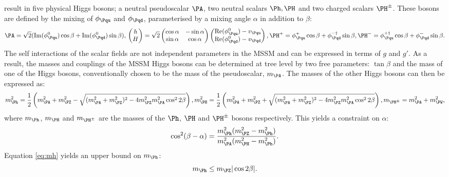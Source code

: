 result in five physical Higgs bosons; a neutral pseudoscalar $\PA$, two neutral
scalars $\Ph,\PH$ and two charged scalars $\PH^{\pm}$. These bosons are defined
by the mixing of $\phi_{\Pqu}$ and $\phi_{\Pqd}$, parameterised by a mixing
angle $\alpha$ in addition to $\beta$:
\begin{equation}
\PA = \sqrt{2}(\text{Im}(\phi_{\Pqu}^{0})\cos\beta +
\text{Im}(\phi_{\Pqd}^{0})\sin\beta), \\ 
\begin{pmatrix} h \\ H \end{pmatrix} = \sqrt{2} 
\begin{pmatrix} \cos\alpha & -\sin\alpha \\ \sin\alpha & \cos\alpha \end{pmatrix}
\begin{pmatrix} \text{Re}(\phi_{\Pqu}^{0}) - v_{\Pqu} \\ \text{Re}(\phi_{\Pqd}^{0}) -
v_{\Pqd}\end{pmatrix}, \\
\PH^{+} = \phi_{\Pqu}^{+} \cos \beta + \phi_{\Pqd}^{-\dagger} \sin \beta,\\
\PH^{-} = \phi_{\Pqu}^{+\dagger} \cos \beta + \phi_{\Pqd}^{-} \sin \beta.
\end{equation}
The self interactions of the scalar fields are not independent parameters in the
\ac{MSSM} and can be expressed in terms of $g$ and $g'$. As a result, the masses
and couplings of the \ac{MSSM} Higgs bosons can be determined at tree level by
two free parameters: $\tan\beta$ and the mass of one of the Higgs bosons,
conventionally chosen to be the mass of the pseudoscalar, $m_{\PA}$. The masses
of the other Higgs bosons can then be expressed as:
\begin{equation}
m_{\Ph}^{2} = \frac{1}{2} \left( m_{\PA}^{2} + m_{\PZ}^{2} - \sqrt{(m_{\PA}^{2} +
m_{\PZ}^{2})^{2} - 4m_{\PZ}^{2}m_{\PA}^{2}\cos^{2}{2\beta} }\right) ,
\label{eq:mh}\\
m_{\PH}^{2} = \frac{1}{2} \left( m_{\PA}^{2} + m_{\PZ}^{2} + \sqrt{(m_{\PA}^{2} +
m_{\PZ}^{2})^{2} - 4m_{\PZ}^{2}m_{\PA}^{2}\cos^{2}{2\beta} }\right) , \\
m_{\PH^{\pm}} = m_{\PA}^{2} + m_{\PW}^{2},
\end{equation}
where $m_{\Ph}$, $m_{\PH}$ and $m_{\PH^{\pm}}$ are the masses of the $\Ph$,
$\PH$ and $\PH^{\pm}$ bosons respectively. This yields a constraint on $\alpha$:
\begin{equation}
\cos^{2}(\beta-\alpha) = \frac{m_{\Ph}^{2}(m_{\PZ}^{2} -
m_{\Ph}^{2})}{m_{\PA}^{2}(m_{\PH}^{2} - m_{\Ph}^{2}) }.
\end{equation}
Equation \ref{eq:mh} yields an upper bound on $m_{\Ph}$:
\begin{equation}
m_{\Ph} \leq m_{\PZ} |\cos{2\beta}|. 
\end{equation}

